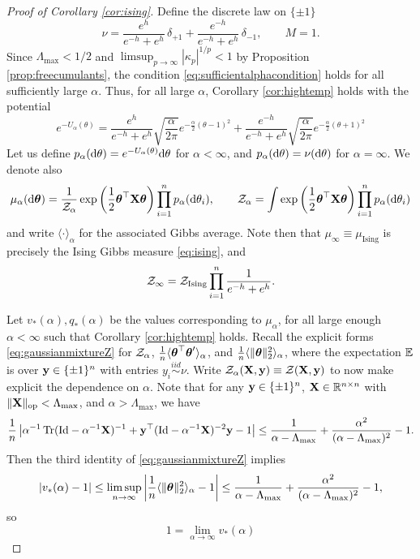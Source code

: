 \begin{proof}[Proof of Corollary \ref{cor:ising}]
Define the discrete law on $\{\pm 1\}$
\[\nu=\frac{e^h}{e^{-h}+e^h}\,\delta_{+1}+\frac{e^{-h}}{e^{-h}+e^h}\,\delta_{-1},
\qquad M=1.\]
Since $\Lambda_{\max}<1/2$
and $\limsup_{p \to \infty} |\kappa_p|^{1/p}<1$ by Proposition
\ref{prop:freecumulants},
the condition \eqref{eq:sufficientalphacondition} holds for all sufficiently
large $\alpha$. Thus, for all large $\alpha$,
Corollary \ref{cor:hightemp} holds with the potential
\[e^{-U_\alpha(\theta)}=\frac{e^h}{e^{-h}+e^h}
\sqrt{\frac{\alpha}{2\pi}}e^{-\frac{\alpha}{2}(\theta-1)^2}
+\frac{e^{-h}}{e^{-h}+e^h}
\sqrt{\frac{\alpha}{2\pi}}e^{-\frac{\alpha}{2}(\theta+1)^2}\]
Let us define $p_\alpha(\mathrm{d}\theta)=e^{-U_\alpha(\theta)}\mathrm{d}\theta$ for
$\alpha<\infty$, and $p_\alpha(\mathrm{d}\theta)=\nu(\mathrm{d}\theta)$ for $\alpha=\infty$.
We denote also
\[\mu_\alpha(\mathrm{d}\boldsymbol{\theta})=\frac{1}{\mathcal{Z}_\alpha}
\exp\left(\frac{1}{2}\boldsymbol{\theta}^\top \mathbf{X}\boldsymbol{\theta}\right)
\prod_{i=1}^n p_\alpha(\mathrm{d}\theta_i),
\qquad \mathcal{Z}_\alpha= \int \exp\left(\frac{1}{2}\boldsymbol{\theta}^\top \mathbf{X}\boldsymbol{\theta}\right)
\prod_{i=1}^n p_\alpha(\mathrm{d}\theta_i)\]
and write $\langle \cdot \rangle_\alpha$ for the associated Gibbs average.
Note then that $\mu_\infty \equiv \mu_{\text{Ising}}$ is precisely the Ising
Gibbs measure \eqref{eq:ising}, and
\begin{equation}\label{eq:ZinftyIsing}
\mathcal{Z}_\infty=\mathcal{Z}_{\text{Ising}} \prod_{i=1}^n \frac{1}{e^{-h}+e^h}.
\end{equation}

Let $v_*(\alpha),q_*(\alpha)$ be the values corresponding to $\mu_\alpha$,
for all large enough $\alpha<\infty$ such that
Corollary \ref{cor:hightemp} holds.
Recall the explicit forms \eqref{eq:gaussianmixtureZ}
for $\mathcal{Z}_\alpha$, $\frac{1}{n}\langle \boldsymbol{\theta}^\top \boldsymbol{\theta}' \rangle_\alpha$,
and $\frac{1}{n}\langle \|\boldsymbol{\theta}\|_2^2 \rangle_\alpha$, where the expectation
$\mathbb{E}$ is over $\mathbf{y} \in \{\pm 1\}^n$ with entries $y_i \overset{iid}{\sim} \nu$.
Write $\mathcal{Z}_\alpha(\mathbf{X},\mathbf{y})
\equiv \mathcal{Z}(\mathbf{X},\mathbf{y})$ to now make explicit the dependence on $\alpha$. Note that
for any $\mathbf{y} \in \{\pm 1\}^n$, $\mathbf{X} \in \mathbb{R}^{n \times n}$
with $\|\mathbf{X}\|_{\mathrm{op}}<\Lambda_{\max}$, and
$\alpha>\Lambda_{\max}$, we have
\[\frac{1}{n}\left|\alpha^{-1}\operatorname{Tr} (\mathrm{Id}-\alpha^{-1}\mathbf{X})^{-1}
+\mathbf{y}^\top(\mathrm{Id}-\alpha^{-1}\mathbf{X})^{-2}\mathbf{y}-1\right|
\leq \frac{1}{\alpha-\Lambda_{\max}}+\frac{\alpha^2}{(\alpha-\Lambda_{\max})^2}-1.\]
Then the third identity of \eqref{eq:gaussianmixtureZ} implies 
\[|v_*(\alpha)-1| \leq \limsup_{n \to \infty}
\left|\frac{1}{n}\langle \|\boldsymbol{\theta}\|_2^2 \rangle_\alpha-1\right| \leq
\frac{1}{\alpha-\Lambda_{\max}}+\frac{\alpha^2}{(\alpha-\Lambda_{\max})^2}-1,\]
so
\begin{equation}\label{eq:qstardef}
1=\lim_{\alpha \to \infty} v_*(\alpha)
\end{equation}


\end{proof}
